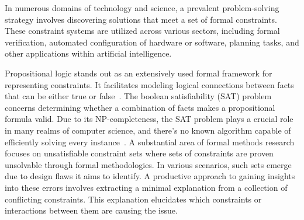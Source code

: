     
    In numerous domains of technology and science, a prevalent problem-solving strategy involves discovering solutions that meet a set of formal constraints. These constraint systems are utilized across various sectors, including formal verification, automated configuration of hardware or software, planning tasks, and other applications within artificial intelligence.
    
    Propositional logic stands out as an extensively used formal framework for representing constraints. It facilitates modeling logical connections between facts that can be either true or false~\cite{buning1999propositional}. The boolean satisfiability (SAT) problem concerns determining whether a combination of facts makes a propositional formula valid. Due to its NP-completeness, the SAT problem plays a crucial role in many realms of computer science, and there's no known algorithm capable of efficiently solving every instance~\cite{biere2009handbook}. A substantial area of formal methods research focuses on unsatisfiable constraint sets where sets of constraints are proven unsolvable through formal methodologies. In various scenarios, such sets emerge due to design flaws it aims to identify. A productive approach to gaining insights into these errors involves extracting a minimal explanation from a collection of conflicting constraints. This explanation elucidates which constraints or interactions between them are causing the issue. 
    
